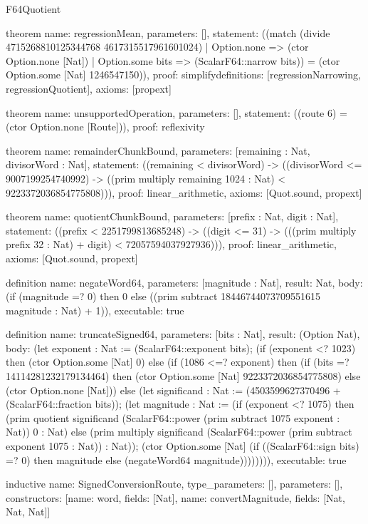 \begin{lexlean}{F64Quotient}
\begin{semanticmodule}
theorem{
  name: regressionMean,
  parameters: [],
  statement: ((match (divide 4715268810125344768 4617315517961601024)
    | Option.none => (ctor Option.none [Nat])
    | Option.some bits => (ScalarF64::narrow bits)) = (ctor Option.some [Nat] 1246547150)),
  proof: simplify{definitions: [regressionNarrowing, regressionQuotient]},
  axioms: [propext]
}

theorem{
  name: unsupportedOperation,
  parameters: [],
  statement: ((route 6) = (ctor Option.none [Route])),
  proof: reflexivity{}
}

theorem{
  name: remainderChunkBound,
  parameters: [remaining : Nat, divisorWord : Nat],
  statement: ((remaining < divisorWord) -> ((divisorWord <= 9007199254740992) -> ((prim multiply remaining 1024 : Nat) < 9223372036854775808))),
  proof: linear_arithmetic{},
  axioms: [Quot.sound, propext]
}

theorem{
  name: quotientChunkBound,
  parameters: [prefix : Nat, digit : Nat],
  statement: ((prefix < 2251799813685248) -> ((digit <= 31) -> (((prim multiply prefix 32 : Nat) + digit) < 72057594037927936))),
  proof: linear_arithmetic{},
  axioms: [Quot.sound, propext]
}

definition{
  name: negateWord64,
  parameters: [magnitude : Nat],
  result: Nat,
  body: (if (magnitude =? 0) then 0 else ((prim subtract 18446744073709551615 magnitude : Nat) + 1)),
  executable: true
}

definition{
  name: truncateSigned64,
  parameters: [bits : Nat],
  result: (Option Nat),
  body: (let exponent : Nat := (ScalarF64::exponent bits); (if (exponent <? 1023) then (ctor Option.some [Nat] 0) else (if (1086 <=? exponent) then (if (bits =? 14114281232179134464) then (ctor Option.some [Nat] 9223372036854775808) else (ctor Option.none [Nat])) else (let significand : Nat := (4503599627370496 + (ScalarF64::fraction bits)); (let magnitude : Nat := (if (exponent <? 1075) then (prim quotient significand (ScalarF64::power (prim subtract 1075 exponent : Nat)) 0 : Nat) else (prim multiply significand (ScalarF64::power (prim subtract exponent 1075 : Nat)) : Nat)); (ctor Option.some [Nat] (if ((ScalarF64::sign bits) =? 0) then magnitude else (negateWord64 magnitude)))))))),
  executable: true
}

inductive{
  name: SignedConversionRoute,
  type_parameters: [],
  parameters: [],
  constructors: [{name: word, fields: [Nat]}, {name: convertMagnitude, fields: [Nat, Nat, Nat]}]
}


\end{semanticmodule}
\end{lexlean}
